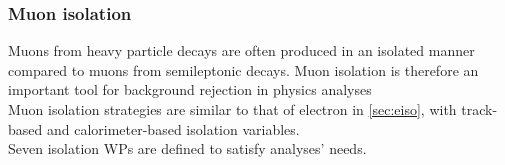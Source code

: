 \documentclass[../thesis.tex]{subfiles}
\begin{document}

\subsubsection*{Muon isolation}
Muons from heavy particle decays are often produced in an isolated manner compared to muons from semileptonic decays. Muon isolation is therefore an important tool for background rejection in physics analyses\\
Muon isolation strategies are similar to that of electron in \autoref{sec:eiso}, with track-based and calorimeter-based isolation variables.\\
Seven isolation WPs are defined to satisfy analyses' needs.
\end{document}
